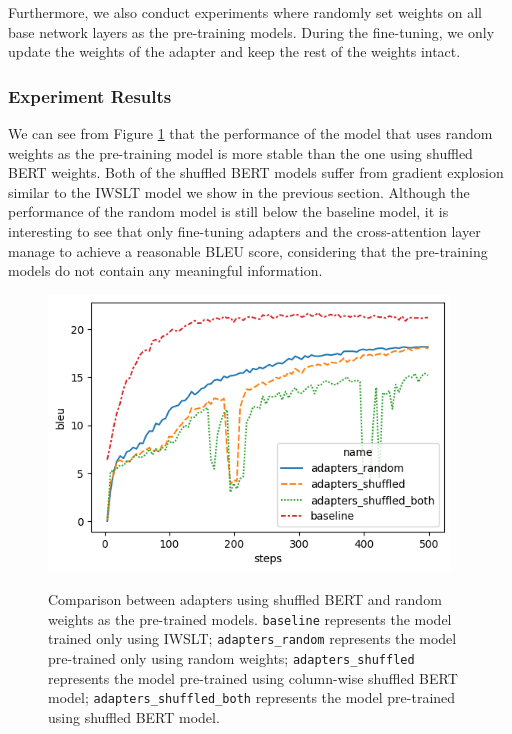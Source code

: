 Furthermore, we also conduct experiments where randomly set weights on all base network layers as the pre-training models. During the fine-tuning, we only update the weights of the adapter and keep the rest of the weights intact.

\subsubsection{Experiment Results}
We can see from Figure \ref{img:shfrndcmp} that the performance of the model that uses random weights as the pre-training model is more stable than the one using shuffled BERT weights. Both of the shuffled BERT models suffer from gradient explosion similar to the IWSLT model we show in the previous section. Although the performance of the random model is still below the baseline model, it is interesting to see that only fine-tuning adapters and the cross-attention layer manage to achieve a reasonable BLEU score, considering that the pre-training models do not contain any meaningful information.
\begin{figure}[h]
    {\includegraphics[width=0.95\textwidth]{img/randomshuffled.png}}
    \centering
    \caption{Comparison between adapters using shuffled BERT and random weights as the pre-trained models. \texttt{baseline} represents the model trained only using IWSLT; \texttt{adapters\_random} represents the model pre-trained only using random weights; \texttt{adapters\_shuffled} represents the model pre-trained using column-wise shuffled BERT model; \texttt{adapters\_shuffled\_both} represents the model pre-trained using shuffled BERT model.}
    \label{img:shfrndcmp}
\end{figure}


